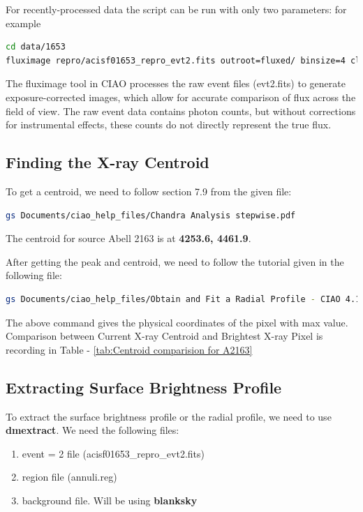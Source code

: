 \documentclass[a4paper,12pt]{article}
\begin{document}
For recently-processed data the script can be run with only two parameters: for example
\begin{lstlisting}[language=bash]
cd data/1653
fluximage repro/acisf01653_repro_evt2.fits outroot=fluxed/ binsize=4 clobber=yes
\end{lstlisting}

The fluximage tool in CIAO processes the raw event files (evt2.fits) to generate exposure-corrected images, which allow for accurate comparison of flux across the field of view. The raw event data contains photon counts, but without corrections for instrumental effects, these counts do not directly represent the true flux.

\subsection{Finding the X-ray Centroid}
To get a centroid, we need to follow section 7.9 from the given file:

\begin{lstlisting}[language=bash]
    gs Documents/ciao_help_files/Chandra Analysis stepwise.pdf    
\end{lstlisting}

The centroid for source Abell 2163 is at \textbf{4253.6, 4461.9}.

After getting the peak and centroid, we need to follow the tutorial given in the following file:

\begin{lstlisting}[language=bash]
    gs Documents/ciao_help_files/Obtain and Fit a Radial Profile - CIAO 4.17.pdf
\end{lstlisting}

The above command gives the physical coordinates of the pixel with max value. Comparison between Current X-ray Centroid and Brightest X-ray Pixel is recording in Table - \ref{tab:Centroid comparision for A2163}

\subsection{Extracting Surface Brightness Profile}
To extract the surface brightness profile or the radial profile, we need to use \textbf{dmextract}. We need the following files:
\begin{enumerate}
    \item event = 2 file (acisf01653\_repro\_evt2.fits)
    \item region file (annuli.reg)
    \item background file. Will be using \textbf{blanksky}
\end{enumerate}
\end{document}
